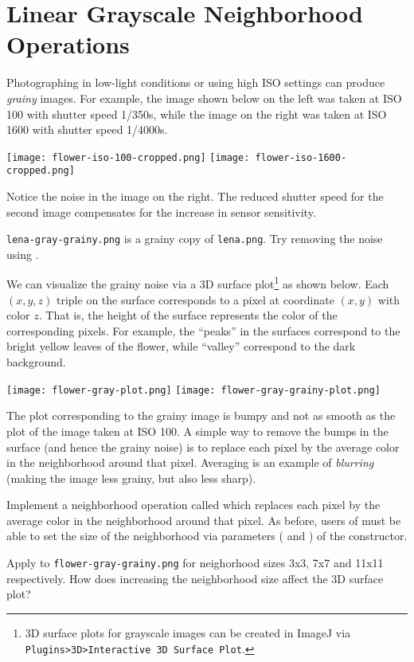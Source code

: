 \documentclass{book}
\begin{document}
\section{Linear Grayscale Neighborhood Operations}
Photographing in low-light conditions or using high ISO settings can produce \emph{grainy} images. For example, the image shown below on the left was taken at ISO 100 with shutter speed 1/350s, while the image on the right was taken at ISO 1600 with shutter speed 1/4000s.
\begin{center}
\texttt{[image: flower-iso-100-cropped.png]}
\texttt{[image: flower-iso-1600-cropped.png]}
\end{center}

Notice the noise in the image on the right. The reduced shutter speed for the second image compensates for the increase in sensor sensitivity.
\begin{exercise}
\texttt{lena-gray-grainy.png} is a grainy copy of \texttt{lena.png}. Try removing the noise using .
\end{exercise}

We can visualize the grainy noise via a 3D surface plot\footnote{3D surface plots for grayscale images can be created in ImageJ via \texttt{Plugins>3D>Interactive 3D Surface Plot}.} as shown below. Each $(x, y, z)$ triple on the surface corresponds to a pixel at coordinate $(x, y)$ with color $z$. That is, the height of the surface represents the color of the corresponding pixels. For example, the ``peaks'' in the surfaces correspond to the bright yellow leaves of the flower, while ``valley'' correspond to the dark background.
\begin{center}
\texttt{[image: flower-gray-plot.png]}
\texttt{[image: flower-gray-grainy-plot.png]}
\end{center}
The plot corresponding to the grainy image is bumpy and not as smooth as the plot of the image taken at ISO 100. A simple way to remove the bumps in the surface (and hence the grainy noise) is to replace each pixel by the average color in the neighborhood around that pixel. Averaging is an example of \emph{blurring} (making the image less grainy, but also less sharp).

\begin{exercise}
Implement a neighborhood operation called  which replaces each pixel by the average color in the neighborhood around that pixel. As before, users of  must be able to set the size of the neighborhood via parameters ( and ) of the constructor.

Apply  to \texttt{flower-gray-grainy.png} for neighorhood sizes 3x3, 7x7 and 11x11 respectively. How does increasing the neighborhood size affect the 3D surface plot? 
\end{exercise}
\end{document}
